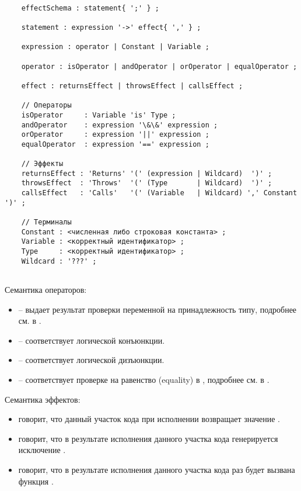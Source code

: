 \begin{verbatim}

    effectSchema : statement{ ';' } ;
    
    statement : expression '->' effect{ ',' } ;
    
    expression : operator | Constant | Variable ;
    
    operator : isOperator | andOperator | orOperator | equalOperator ;
    
    effect : returnsEffect | throwsEffect | callsEffect ;
      
    // Операторы
    isOperator     : Variable 'is' Type ;
    andOperator    : expression '\&\&' expression ;
    orOperator     : expression '||' expression ;
    equalOperator  : expression '==' expression ;
    
    // Эффекты
    returnsEffect : 'Returns' '(' (expression | Wildcard)  ')' ;
    throwsEffect  : 'Throws'  '(' (Type       | Wildcard)  ')' ;
    callsEffect   : 'Calls'   '(' (Variable   | Wildcard) ',' Constant ')' ;
    
    // Терминалы
    Constant : <численная либо строковая константа> ; 
    Variable : <корректный идентификатор> ;        
    Type     : <корректный идентификатор> ;
    Wildcard : '???' ;
    
\end{verbatim}

Семантика операторов:

\begin{itemize}
    \item {} -- выдает результат проверки переменной на принадлежность типу, подробнее см. в \cite{kotlin:typechecks}.
    
    \item {} -- соответствует логической конъюнкции.
    
    \item {} -- соответствует логической дизъюнкции.
    
    \item {} -- соответствует проверке на равенство (equality) в , подробнее см. в \cite{kotlin:equality}.
\end{itemize}

Семантика эффектов:

\begin{itemize}
    \item {} говорит, что данный участок кода при исполнении возвращает значение .
    
    \item {} говорит, что в результате исполнения данного участка кода генерируется исключение .
    
    \item {} говорит, что в результате исполнения данного участка кода  раз будет вызвана функция .
\end{itemize}

